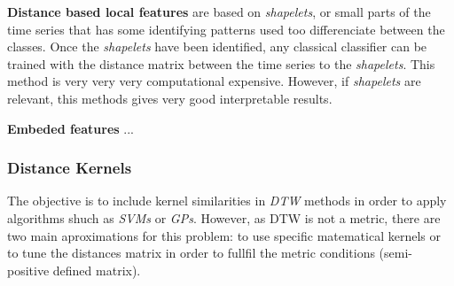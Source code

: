 \textbf{Distance based local features} are based on \textit{shapelets}, or small parts of the time series that has some identifying patterns used too differenciate between the classes. Once the \textit{shapelets} have been identified, any classical classifier can be trained with the distance matrix between the time series to the \textit{shapelets}. This method is very very very computational expensive. However, if \textit{shapelets} are relevant, this methods gives very good interpretable results.

\textbf{Embeded features} ...

\subsubsection{Distance Kernels}
The objective is to include kernel similarities in \textit{DTW} methods in order to apply algorithms shuch as \textit{SVMs} or \textit{GPs}. However, as DTW is not a metric, there are two main aproximations for this problem: to use specific matematical kernels or to tune the distances matrix in order to fullfil the metric conditions (semi-positive defined matrix).

